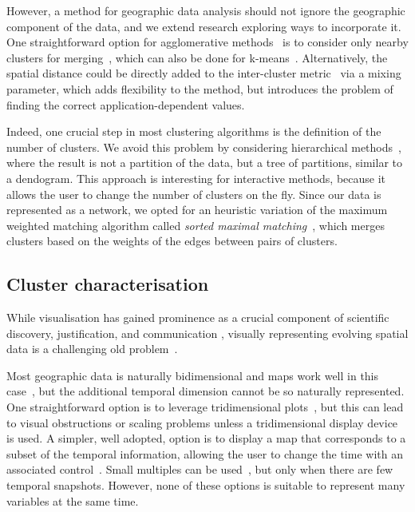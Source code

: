 However, a method for geographic data analysis should not ignore the geographic
component of the data, and we extend research exploring ways to incorporate it.
One straightforward option for agglomerative methods~\citep{han2001spatial} is
to consider only nearby clusters for merging~\citep{Chavent2017}, which can also
be done for k-means~\citep{soor2018extending}. Alternatively, the spatial
distance could be directly added to the inter-cluster metric~\citep{Chavent2017}
via a mixing parameter, which adds flexibility to the method, but introduces the
problem of finding the correct application-dependent values.

Indeed, one crucial step in most clustering algorithms is the definition of the
number of clusters. We avoid this problem by considering hierarchical
methods~\citep{soille2012morphological}, where the result is not a partition of
the data, but a tree of partitions, similar to a dendogram. This approach is
interesting for interactive methods, because it allows the user to change the
number of clusters on the fly. Since our data is represented as a network, we
opted for an heuristic variation of the maximum weighted matching algorithm
called \emph{sorted maximal matching}~\citep{markus2017}, which merges clusters
based on the weights of the edges between pairs of clusters. 



\subsection{Cluster characterisation}
While visualisation has gained prominence as a crucial component of scientific
discovery, justification, and communication , visually representing evolving spatial data is a challenging old
problem~\citep{monmonier1990strategies,andrienko2003exploratory,ferreira2015visual,Zheng2016}.

Most geographic data is naturally bidimensional and maps work well in this
case~\citep{Zheng2016,ward2015interactive}, but the additional temporal
dimension cannot be so naturally represented. One straightforward option is to
leverage tridimensional plots~\citep{andrienko2014visualization,Tominski2012a},
but this can lead to visual obstructions or scaling problems unless a
tridimensional display device is used. A simpler, well adopted,
option is to display a map that corresponds to a subset of the temporal
information, allowing the user to change the time with an associated
control~\citep{Chen2017,Valdivia2015,Alce2018,Doraiswamy2014}. Small multiples
can be used~\citep{VonLandesberger2016}, but only when there are few temporal
snapshots. However, none of these options is suitable to represent many
variables at the same time.


